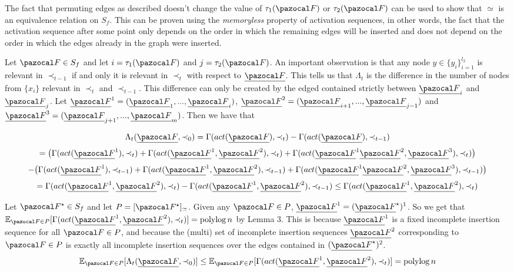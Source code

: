 \documentclass{article}
\DeclareMathOperator*{\polylog}{polylog}
\begin{document}
The fact that permuting edges as described doesn't change the value of $\tau_1(\pazocal F)$ or $\tau_2(\pazocal F)$ can be used to show that $\simeq$ is an equivalence relation on $S_f$. This can be proven using the \textit{memoryless} property of activation sequences, in other words, the fact that the activation sequence after some point only depends on the order in which the remaining edges will be inserted and does not depend on the order in which the edges already in the graph were inserted.

Let $\pazocal F \in S_f$ and let $i=\tau_1(\pazocal F)$ and $j=\tau_2(\pazocal F)$. An important observation is that any node $y \in \{y_i\}_{i=1}^{l_2}$ is relevant in $\prec_{t-1}$ if and only it is relevant in $\prec_t$ with respect to $\underline{\pazocal F}$. This tells us that $\Lambda_t$ is the difference in the number of nodes from $\{x_i\}$ relevant in $\prec_t$ and $\prec_{t-1}$. This difference can only be created by the edged contained strictly between $\underline{\pazocal F}_i$ and $\underline{\pazocal F}_j$. Let $\underline{\pazocal F}^1 = (\underline{\pazocal F}_1,...,\underline{\pazocal F}_i)$, $\underline{\pazocal F}^2 = (\underline{\pazocal F}_{i+1},...,\underline{\pazocal F}_{j-1})$ and $\underline{\pazocal F}^3 = (\underline{\pazocal F}_{j+1},...,\underline{\pazocal F}_m)$. Then we have that

\[ \Lambda_t(\underline{\pazocal F}, \prec_0) = \Gamma(act(\underline{\pazocal F}), \prec_{t}) - \Gamma(act(\underline{\pazocal F}), \prec_{t-1}) \]
\[ =\big(\Gamma(act(\underline{\pazocal F}^1), \prec_{t}) + \Gamma(act(\underline{\pazocal F}^1, \underline{\pazocal F}^2), \prec_{t}) + \Gamma(act(\underline{\pazocal F}^1\underline{\pazocal F}^2, \underline{\pazocal F}^3), \prec_{t}) \big) \]
\[ - \big(\Gamma(act(\underline{\pazocal F}^1), \prec_{t-1}) + \Gamma(act(\underline{\pazocal F}^1, \underline{\pazocal F}^2), \prec_{t-1}) + \Gamma(act(\underline{\pazocal F}^1\underline{\pazocal F}^2, \underline{\pazocal F}^3), \prec_{t-1}) \big)\]
\[ = \Gamma(act(\underline{\pazocal F}^1, \underline{\pazocal F}^2), \prec_{t}) - \Gamma(act(\underline{\pazocal F}^1, \underline{\pazocal F}^2), \prec_{t-1}) \leq \Gamma(act(\underline{\pazocal F}^1, \underline{\pazocal F}^2), \prec_{t}) \]

Let $\pazocal F^\star \in S_f$ and let $P=[\pazocal F^\star]_{\simeq}$. Given any $\pazocal F \in P$, $\underline{\pazocal F}^1 = (\underline{\pazocal F}^\star)^1$. So we get that $ \mathbb E_{\pazocal F \in P} [\Gamma(act(\underline{\pazocal F}^1, \underline{\pazocal F}^2), \prec_{t})] = \polylog n$ by Lemma 3. This is because $\underline{\pazocal F}^1$ is a fixed incomplete insertion sequence for all $\pazocal F \in P$, and because the (multi) set of incomplete insertion sequences $\underline{\pazocal F}^2$ corresponding to $\pazocal F \in P$ is exactly all incomplete insertion sequences over the edges contained in $(\underline{\pazocal F}^\star)^2$.
\[ \mathbb E_{\pazocal F \in P} [\Lambda_t(\underline{\pazocal F}, \prec_0)] \leq \mathbb E_{\pazocal F \in P} [\Gamma(act(\underline{\pazocal F}^1, \underline{\pazocal F}^2), \prec_{t})] = \polylog n \]
\end{document}
